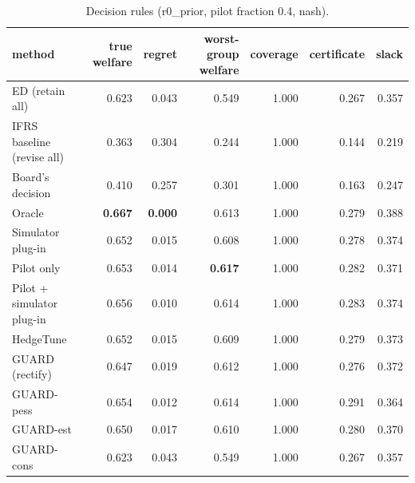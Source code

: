 \begin{table}[t]
\centering
\small
\begin{tabular}{lrrrrrr}
\toprule
method & true welfare & regret & worst-group welfare & coverage & certificate & slack \\
\midrule
ED (retain all) & 0.623 & 0.043 & 0.549 & 1.000 & 0.267 & 0.357 \\
IFRS baseline (revise all) & 0.363 & 0.304 & 0.244 & 1.000 & 0.144 & 0.219 \\
Board's decision & 0.410 & 0.257 & 0.301 & 1.000 & 0.163 & 0.247 \\
Oracle & \textbf{0.667} & \textbf{0.000} & 0.613 & 1.000 & 0.279 & 0.388 \\
Simulator plug-in & 0.652 & 0.015 & 0.608 & 1.000 & 0.278 & 0.374 \\
Pilot only & 0.653 & 0.014 & \textbf{0.617} & 1.000 & 0.282 & 0.371 \\
Pilot + simulator plug-in & 0.656 & 0.010 & 0.614 & 1.000 & 0.283 & 0.374 \\
HedgeTune & 0.652 & 0.015 & 0.609 & 1.000 & 0.279 & 0.373 \\
GUARD (rectify) & 0.647 & 0.019 & 0.612 & 1.000 & 0.276 & 0.372 \\
GUARD-pess & 0.654 & 0.012 & 0.614 & 1.000 & 0.291 & 0.364 \\
GUARD-est & 0.650 & 0.017 & 0.610 & 1.000 & 0.280 & 0.370 \\
GUARD-cons & 0.623 & 0.043 & 0.549 & 1.000 & 0.267 & 0.357 \\
\bottomrule
\end{tabular}
\caption{Decision rules (r0\_prior, pilot fraction 0.4, nash).}
\label{tab:methods-nash}
\end{table}
